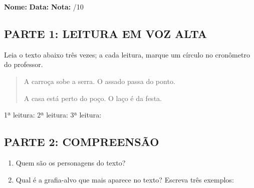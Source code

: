 \begin{exercicio}

\noindent\textbf{Nome:} \underline{\hspace{3.2cm}} \quad \textbf{Data:} \underline{\hspace{1.6cm}} \quad \textbf{Nota:} \underline{\hspace{0.9cm}}/10


\subsection*{PARTE 1: LEITURA EM VOZ ALTA}

Leia o texto abaixo três vezes; a cada leitura, marque um círculo no cronômetro do professor.

\begin{quote}
A carroça sobe a serra. O assado passa do ponto.

A casa está perto do poço. O laço é da festa.
\end{quote}

\begin{center}
1ª leitura: \underline{\hspace{1.5cm}} \quad 2ª leitura: \underline{\hspace{1.5cm}} \quad 3ª leitura: \underline{\hspace{1.5cm}}
\end{center}

\subsection*{PARTE 2: COMPREENSÃO}

\begin{enumerate}

  \item Quem são os personagens do texto?
  \begin{center}
  \underline{\hspace{12cm}}
  \end{center}

  \item Qual é a grafia-alvo que mais aparece no texto? Escreva três exemplos:
  \begin{center}
  \underline{\hspace{3.5cm}} \quad \underline{\hspace{3.5cm}} \quad \underline{\hspace{3.5cm}}
  \end{center}


\end{enumerate}
\end{exercicio}
